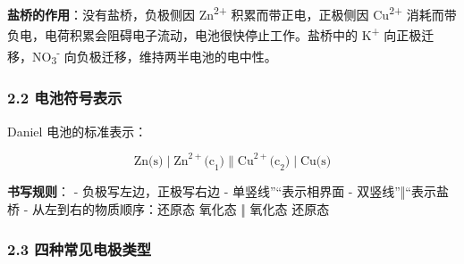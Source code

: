 \textbf{盐桥的作用}：没有盐桥，负极侧因 Zn\textsuperscript{2+} 积累而带正电，正极侧因 Cu\textsuperscript{2+} 消耗而带负电，电荷积累会阻碍电子流动，电池很快停止工作。盐桥中的 K\textsuperscript{+} 向正极迁移，NO\textsubscript{3}\textsuperscript{-} 向负极迁移，维持两半电池的电中性。

\subsubsection{2.2 电池符号表示}\label{ux7535ux6c60ux7b26ux53f7ux8868ux793a}

Daniel 电池的标准表示：

\[
\text{Zn(s)} \mid \text{Zn}^{2+}\text{(c}_1\text{)} \| \text{Cu}^{2+}\text{(c}_2\text{)} \mid \text{Cu(s)}
\]

\textbf{书写规则}：
- 负极写左边，正极写右边
- 单竖线''\textbar{}``表示相界面
- 双竖线''‖``表示盐桥
- 从左到右的物质顺序：还原态 \textbar{} 氧化态 ‖ 氧化态 \textbar{} 还原态

\subsubsection{2.3 四种常见电极类型}\label{ux56dbux79cdux5e38ux89c1ux7535ux6781ux7c7bux578b}

